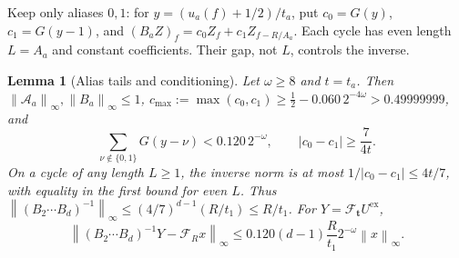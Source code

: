 \documentclass[11pt]{article}
\newtheorem{lemma}[theorem]{Lemma}
\theoremstyle{definition}
\renewcommand{\label}[1]{}%
\newcommand{\cA}{\mathcal{A}}
\newcommand{\cF}{\mathcal{F}}
\newcommand{\norm}[1]{\left\lVert #1 \right\rVert}
\newcommand{\abs}[1]{\left\lvert #1 \right\rvert}
\begin{document}
Keep only aliases $0,1$: for $y=(u_a(f)+1/2)/t_a$, put
$c_0=G(y)$, $c_1=G(y-1)$, and
$(B_aZ)_f=c_0Z_f+c_1Z_{f-R/A_a}$.
Each cycle has even length $L=A_a$ and constant coefficients.
Their gap, not $L$, controls the inverse.

\begin{lemma}[Alias tails and conditioning]\label{lem:bridge-cond}
Let $\omega\ge8$ and $t=t_a$.
Then $\norm{\cA_a}_\infty,\norm{B_a}_\infty\le1$,
$c_{\max}:=\max(c_0,c_1)\ge\frac12-0.060\,2^{-4\omega}>0.49999999$, and
\[
 \sum_{\nu\notin\{0,1\}}G(y-\nu)<0.120\,2^{-\omega},
 \qquad \abs{c_0-c_1}\ge\frac7{4t}.
\]
On a cycle of any length $L\ge1$, the inverse norm is at most
$1/\abs{c_0-c_1}\le4t/7$, with equality in the first bound for even $L$.
Thus $\norm{(B_2\cdots B_d)^{-1}}_\infty
\le(4/7)^{d-1}(R/t_1)\le R/t_1$.
For $Y=\cF_{\mathbf t}U^{\mathrm{ex}}$,
\begin{equation}\label{eq:bridge-alias-err}
 \norm{(B_2\cdots B_d)^{-1}Y-\cF_Rx}_\infty
 \le0.120(d-1)\frac{R}{t_1}2^{-\omega}\norm{x}_\infty.
\end{equation}
\end{lemma}
\end{document}

